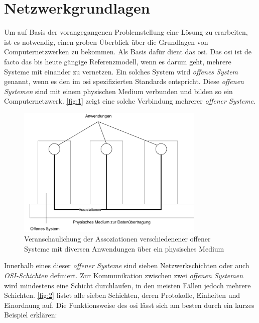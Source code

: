 \documentclass[titlepage]{report}
\begin{document}
\section*{Netzwerkgrundlagen}
Um auf Basis der vorangegangenen Problemstellung eine Lösung zu
erarbeiten, ist es notwendig, einen groben Überblick über die Grundlagen
von Computernetzwerken zu bekommen. Als Basis dafür dient das \gls{osi}. Das
\gls{osi} ist de facto das bis heute gängige Referenzmodell, wenn es
darum geht, mehrere Systeme mit einander zu vernetzen. Ein solches System
wird \emph{offenes System} genannt, wenn es den im \gls{osi}
spezifizierten Standards entspricht\cite[Siehe Abschnitt
4.1.2]{ITUOSI}. Diese \emph{offenen Systemen} sind mit einem physischen
Medium verbunden und bilden so ein Computernetzwerk. \autoref{fig:1}
zeigt eine solche Verbindung mehrerer \emph{offener Systeme}.
\begin{figure}[H]
    \centering
    \includegraphics[width=0.8\textwidth]{figures/open_systems.pdf}
    \caption{Veranschaulichung der Assoziationen verschiedenener offener
    Systeme mit diversen Anwendungen über ein physisches Medium}\label{fig:1}
\end{figure}
Innerhalb eines dieser \emph{offener Systeme} sind sieben
Netzwerkschichten oder auch \emph{OSI-Schichten} definiert\cite[Siehe
Abschnitt 6.1.2]{ITUOSI}. Zur
Kommunikation zwischen zwei \emph{offenen Systemen} wird mindestens eine
Schicht durchlaufen, in den meisten Fällen jedoch mehrere Schichten.
\autoref{fig:2} listet alle sieben Schichten, deren Protokolle,
Einheiten und Einordnung auf. Die Funktionsweise des \gls{osi} lässt
sich am besten durch ein kurzes Beispiel erklären:
\end{document}
